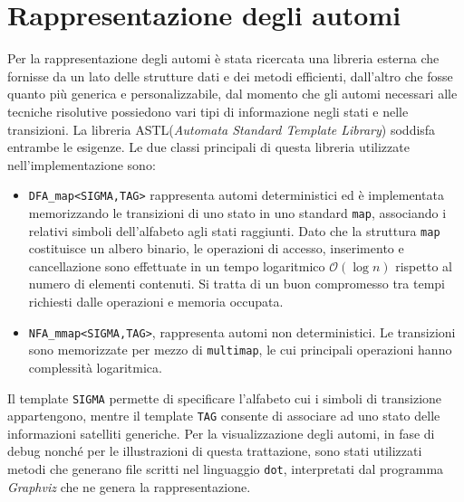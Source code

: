 \section{Rappresentazione degli automi}
Per la rappresentazione degli automi è stata ricercata una libreria esterna che fornisse da un lato delle strutture dati e dei metodi efficienti, dall'altro che fosse quanto più generica e personalizzabile, dal momento che gli automi necessari alle tecniche risolutive possiedono vari tipi di informazione negli stati e nelle transizioni. La libreria ASTL(\emph{Automata Standard Template Library})\cite{web:astl} soddisfa entrambe le esigenze. Le due classi principali di questa libreria utilizzate nell'implementazione sono:
\begin{itemize}
\item \verb|DFA_map<SIGMA,TAG>| rappresenta automi deterministici ed è implementata memorizzando le transizioni di uno stato in uno standard \verb|map|, associando i relativi simboli dell'alfabeto agli stati raggiunti. Dato che la struttura \verb|map| costituisce un albero binario, le operazioni di accesso, inserimento e cancellazione sono effettuate in un tempo logaritmico $\mathcal{O}(\log n)$ rispetto al numero di elementi contenuti.  Si tratta di un buon compromesso tra tempi richiesti dalle operazioni e memoria occupata.
\item \verb|NFA_mmap<SIGMA,TAG>|, rappresenta automi non deterministici. Le transizioni sono memorizzate per mezzo di \verb|multimap|, le cui principali operazioni hanno complessità logaritmica.
\end{itemize}
Il template \verb|SIGMA| permette di specificare l'alfabeto cui i simboli di transizione appartengono, mentre il template \verb|TAG| consente di associare ad uno stato delle informazioni satelliti generiche. 
Per la visualizzazione degli automi, in fase di debug nonché per le illustrazioni di questa trattazione, sono stati utilizzati metodi che generano file scritti nel linguaggio \verb|dot|, interpretati dal programma \emph{Graphviz}\cite{web:graphviz} che ne genera la rappresentazione.

